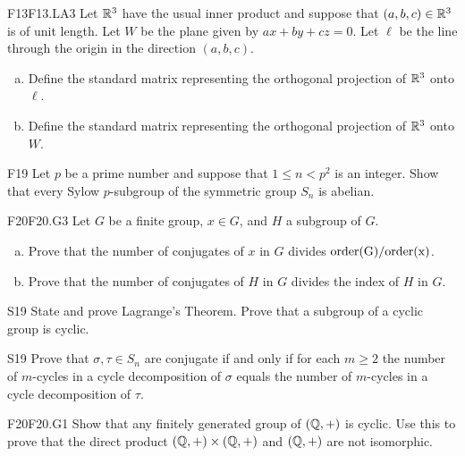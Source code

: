 \documentclass[../AlgebraQualSolutions.tex]{subfiles}
\begin{document}
\begin{prob}{F13}{F13.LA3}
	Let $\mathbb{R}^3$ have  the usual inner product and suppose that $(a,b,c) \in \mathbb{R}^3$ is of unit length. Let $W$ be the plane given by $ax + by + cz = 0$. Let $\ell$ be the line through the origin in the direction $(a,b,c)$.
	\begin{enumerate}[(a)]
		\item Define the standard matrix representing the orthogonal projection of $\mathbb{R}^3$ onto $\ell$.
		\item Define the standard matrix representing the orthogonal projection of $\mathbb{R}^3$ onto $W$.
	\end{enumerate}
\end{prob}

\begin{prob}{F19}{}
Let $p$ be a prime number and suppose that $1 \leq n <p^2$ is an integer. Show that every Sylow $p$-subgroup of the symmetric group $S_n$ is abelian.
\end{prob}


\begin{prob}{F20}{F20.G3}
Let $G$ be a finite group, $x \in G$, and $H$ a subgroup of $G$.
\begin{enumerate}[(a)]
\item Prove that the number of conjugates of $x$ in $G$ divides $\rm{order}(G)/\rm{order}(x)$.
\item Prove that the number of conjugates of $H$ in $G$ divides the index of $H$ in $G$.
\end{enumerate}
\end{prob}

\begin{prob}{S19}{}
State and prove Lagrange's Theorem. Prove that a subgroup of a cyclic group is cyclic.
\end{prob}

\begin{prob}{S19}{}
Prove that $\sigma,\tau \in S_n$ are conjugate if and only if for each $m \geq 2$ the number of $m$-cycles in a cycle decomposition of $\sigma$ equals the number of $m$-cycles in a cycle decomposition of $\tau$.
\end{prob}

\begin{prob}{F20}{F20.G1}
Show that any finitely generated group of $(\mathbb{Q},+)$ is cyclic. Use this to prove that the direct product $(\mathbb{Q},+) \times (\mathbb{Q},+)$ and $(\mathbb{Q},+)$ are not isomorphic.
\end{prob}
\end{document}
